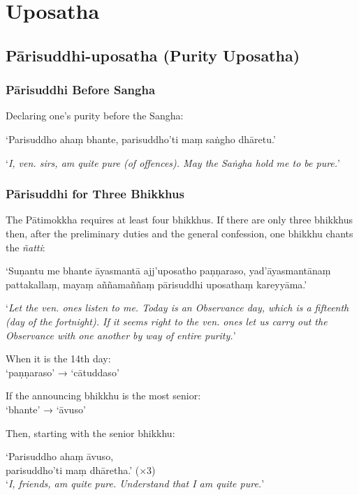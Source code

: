 \chapter{Uposatha}

\section{Pārisuddhi-uposatha (Purity Uposatha)}

\subsection{Pārisuddhi Before Sangha}

Declaring one's purity before the Sangha:

‘Parisuddho ahaṃ bhante, parisuddho'ti maṃ saṅgho dhāretu.’

‘\emph{I, ven. sirs, am quite pure (of offences). May the Saṅgha hold me to be pure.}’


\subsection{Pārisuddhi for Three Bhikkhus}

The Pātimokkha requires at least four bhikkhus. If there are only three bhikkhus then, after the preliminary duties and the general confession, one bhikkhu
chants the \emph{ñatti}:

‘Suṇantu me bhante āyasmantā ajj'uposatho paṇṇaraso, yad'āyasmantānaṃ
pattakallaṃ, mayaṃ aññamaññaṃ pārisuddhi uposathaṃ kareyyāma.’

‘\emph{Let the ven. ones listen to me. Today is an Observance day, which is a
  fifteenth (day of the fortnight). If it seems right to the ven. ones let
  us carry out the Observance with one another by way of entire purity.}’

When it is the 14th day:\\
‘paṇṇaraso’ → ‘cātuddaso’

If the announcing bhikkhu is the most senior:\\
‘bhante’ → ‘āvuso’

Then, starting with the senior bhikkhu:

‘Parisuddho ahaṃ āvuso,\\
parisuddho'ti maṃ dhāretha.’ (×3)\\
‘\emph{I, friends, am quite pure. Understand that I am quite pure.}’

